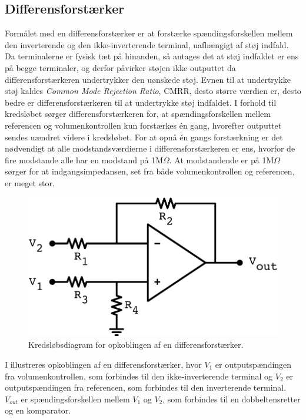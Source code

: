 \subsection{Differensforstærker}
\label{Differensforstaerker}
%
Formålet med en differensforstærker er at forstærke spændingsforskellen mellem den inverterende og den ikke-inverterende terminal, uafhængigt af støj indfald. Da terminalerne er fysisk tæt på hinanden, så antages det at støj indfaldet er ens på begge terminaler, og derfor påvirker støjen ikke outputtet da differensforstærkeren undertrykker den uønskede støj. Evnen til at undertrykke støj kaldes \textit{Common Mode Rejection Ratio}, CMRR, desto større værdien er, desto bedre er differensforstærkeren til at undertrykke støj indfaldet. I forhold til kredsløbet sørger differensforstærkeren for, at spændingsforskellen mellem referencen og volumenkontrollen kun forstærkes én gang, hvorefter outputtet sendes uændret videre i kredsløbet. For at opnå én gangs forstærkning er det nødvendigt at alle modstandsværdierne i differensforstærkeren er ens, hvorfor de fire modstande alle har en modstand på 1M$\Omega$. At modstandende er på 1M$\Omega$ sørger for at indgangsimpedansen, set fra både volumenkontrollen og referencen, er meget stor. 
%
\begin{figure}[H]
	\centering
	\includegraphics[resolution=300,scale=\circuitSize]{Figure/Circuits/Differensforstaerker.pdf}
	\caption{Kredsløbsdiagram for opkoblingen af en differensforstærker.}
	\label{fig:Differensforstaerker}
\end{figure}
\noindent
%
I  illustreres opkoblingen af en differensforstærker, hvor $V_1$ er outputspændingen fra volumenkontrollen, som forbindes til den ikke-inverterende terminal og $V_2$ er outputspændingen fra referencen, som forbindes til den inverterende terminal. $V_{out}$ er spændingsforskellen mellem $V_1$ og $V_2$, som forbindes til en dobbeltensretter og en komparator.\\[5mm]
